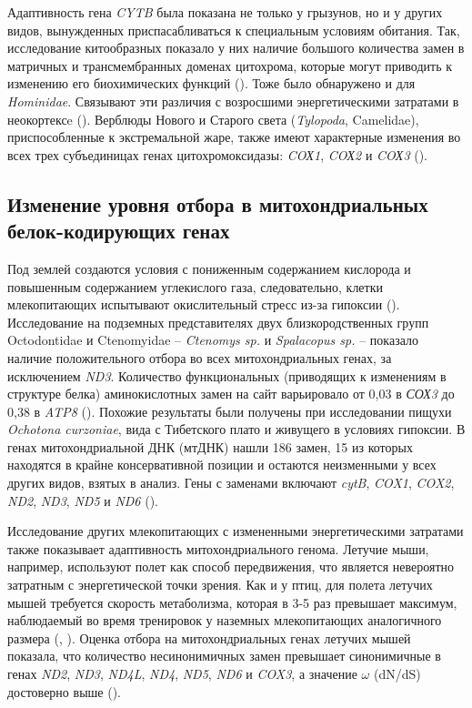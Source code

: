 Адаптивность гена \textit{CYTB} была показана не только у грызунов, но и у других видов, вынужденных приспасабливаться к специальным  условиям обитания. Так, исследование китообразных показало у них наличие большого количества замен в матричных и трансмембранных доменах цитохрома, которые могут приводить к изменению его биохимических функций (\cite{McClellan2005}). Тоже было обнаружено и для \textit{Hominidae}. Связывают эти различия с возросшими энергетическими затратами в неокортексe (\cite{Adkins1994}). Верблюды Нового и Старого света (\textit{Tylopoda}, Camelidae), приспособленные к экстремальной жаре, также имеют характерные изменения во всех трех субъединицах генах цитохромоксидазы: \textit{COХ1}, \textit{COХ2} и \textit{COХ3} (\cite{DiRocco2006}). 

\subsection{Изменение уровня отбора в митохондриальных белок-кодирующих генах}

Под землей создаются условия с пониженным содержанием кислорода и повышенным содержанием углекислого газа, следовательно, клетки млекопитающих испытывают окислительный стресс из-за гипоксии (\cite{Dirmeier2002}). Исследование на подземных представителях двух близкородственных групп Octodontidae и Ctenomyidae -- \textit{Ctenomys sp.} и \textit{Spalacopus sp.} -- показало наличие положительного отбора во всех митохондриальных генах, за исключением \textit{ND3}. Количество функциональных (приводящих к изменениям в структуре белка) аминокислотных замен на сайт варьировало от 0,03 в \textit{СОХ3} до 0,38 в \textit{ATP8}  (\cite{Tomasco2011}). Похожие результаты были получены при исследовании пищухи \textit{Ochotona curzoniae}, вида с Тибетского плато и живущего в условиях гипоксии. В генах митохондриальной ДНК (мтДНК) нашли 186 замен, 15 из которых находятся в крайне консервативной позиции и остаются неизменными у всех других видов, взятых в анализ. Гены с заменами включают \textit{cytB}, \textit{COX1}, \textit{COX2}, \textit{ND2}, \textit{ND3}, \textit{ND5} и \textit{ND6} (\cite{Luo2008}). 

Исследование других млекопитающих с измененными энергетическими затратами также показывает адаптивность митохондриального генома. Летучие мыши, например, используют полет как способ передвижения, что является невероятно затратным с энергетической точки зрения. Как и у птиц, для полета летучих мышей требуется скорость метаболизма, которая в 3-5 раз превышает максимум, наблюдаемый во время тренировок у наземных млекопитающих аналогичного размера (\cite{THOMASSTEVENP.SUTHERS1972}, \cite{Maina2000}).  Оценка отбора на митохондриальных генах летучих мышей показала, что количество несинонимичных замен превышает синонимичные в генах  \textit{ND2}, \textit{ND3}, \textit{ND4L}, \textit{ND4}, \textit{ND5}, \textit{ND6} и \textit{COX3}, а значение $\omega$ (dN/dS) достоверно выше (\cite{Shen2010}). 


